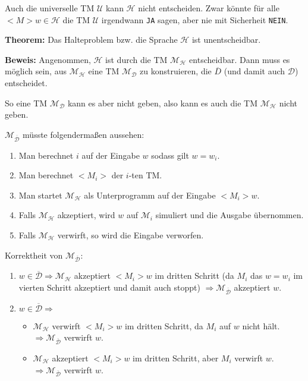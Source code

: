 \documentclass{scrartcl}%
\begin{document}
    \vspace*{0.3cm}
    Auch die universelle TM $\mathcal{U}$ kann $\mathcal{H}$ nicht entscheiden.
    Zwar könnte für alle $<M>w \in \mathcal{H}$ die TM $\mathcal{U}$ irgendwann \texttt{JA} sagen,
    aber nie mit Sicherheit \texttt{NEIN}.

    \vspace*{0.5cm}
    \textbf{\textsf{Theorem:}} Das Halteproblem bzw. die Sprache $\mathcal{H}$ ist unentscheidbar.

    \vspace*{0.3cm}
    \textbf{\textsf{Beweis:}} Angenommen, $\mathcal{H}$ ist durch die TM $\mathcal{M}_\mathcal{H}$ entscheidbar.
    Dann muss es möglich sein, aus $\mathcal{M}_\mathcal{H}$ eine TM  $\mathcal{M}_\mathcal{D}$ zu konstruieren, die
    $\overline{D}$ (und damit auch $\mathcal{D}$) entscheidet.

    So eine TM $\mathcal{M}_\mathcal{D}$ kann es aber nicht geben, also kann es auch die TM $\mathcal{M}_\mathcal{H}$ nicht geben.

    \vspace*{0.3cm}
    $\mathcal{M}_{\overline{\mathcal{D}}}$ müsste folgendermaßen aussehen:
    \begin{enumerate}
        \item Man berechnet $i$ auf der Eingabe $w$ sodass gilt $w = w_i$.
        \item Man berechnet $<M_{i}>$ der $i$-ten TM.
        \item Man startet $\mathcal{M}_\mathcal{H}$ als Unterprogramm auf der Eingabe $<M_i>w$.
        \item Falls $\mathcal{M}_\mathcal{H}$ akzeptiert, wird $w$ auf $\mathcal{M}_i$ simuliert und die Ausgabe übernommen.
        \item Falls $\mathcal{M}_\mathcal{H}$ verwirft, so wird die Eingabe verworfen.
    \end{enumerate}

    Korrektheit von $\mathcal{M}_{\overline{\mathcal{D}}}$:
    \begin{enumerate}
        \item $w \in \overline{\mathcal{D}} \Rightarrow \mathcal{M}_\mathcal{H}$ akzeptiert $<M_{i}>w$ im dritten Schritt
        (da $M_i$ das $w=w_i$ im vierten Schritt akzeptiert und damit auch stoppt)
        $\Rightarrow \mathcal{M}_{\overline{\mathcal{D}}}$ akzeptiert $w$.
        \item $w \in \overline{\mathcal{D}} \Rightarrow$
        \begin{itemize}
            \item $\mathcal{M}_\mathcal{H}$ verwirft $<M_{i}>w$ im dritten Schritt, da $M_i$ auf $w$ nicht hält.
            \newline $\Rightarrow \mathcal{M}_{\overline{\mathcal{D}}}$ verwirft $w$.
            \item $\mathcal{M}_\mathcal{H}$ akzeptiert $<M_{i}>w$ im dritten Schritt, aber $M_i$ verwirft $w$.
            \newline $\Rightarrow \mathcal{M}_{\overline{\mathcal{D}}}$ verwirft $w$.
        \end{itemize}
    \end{enumerate}\proofend
\end{document}
